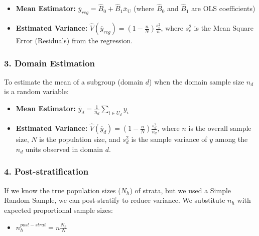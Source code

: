 \documentclass[
  letterpaper,
  DIV=11,
  numbers=noendperiod]{scrreprt}
\providecommand{\tightlist}{%
  \setlength{\itemsep}{0pt}\setlength{\parskip}{0pt}}
\renewcommand{\[}{\begin{equation}}
\renewcommand{\]}{\end{equation}}
\begin{document}
\begin{tcolorbox}
\begin{itemize}
\tightlist
\item
  \textbf{Mean Estimator:}
  \(\overline{y}_{reg} = \hat{B}_0 + \hat{B}_1 \overline{x}_{\text{U}}\)
  (where \(\hat{B}_0\) and \(\hat{B}_1\) are OLS coefficients)
\item
  \textbf{Estimated Variance:}
  \(\hat{V}(\overline{y}_{reg}) = \left(1 - \frac{n}{N}\right) \frac{s_e^2}{n}\),
  where \(s_e^2\) is the Mean Square Error (Residuals) from the
  regression.
\end{itemize}

\subsubsection*{3. Domain Estimation}\label{domain-estimation}

To estimate the mean of a subgroup (domain \(d\)) when the domain sample
size \(n_d\) is a random variable:

\begin{itemize}
\tightlist
\item
  \textbf{Mean Estimator:}
  \(\overline{y}_d = \frac{1}{n_d} \sum_{i \in U_d} y_i\)
\item
  \textbf{Estimated Variance:}
  \(\hat{V}(\overline{y}_d) = \left(1 - \frac{n}{N}\right) \frac{s_d^2}{n_d}\),
  where \(n\) is the overall sample size, \(N\) is the population size,
  and \(s_d^2\) is the sample variance of \(y\) among the \(n_d\) units
  observed in domain \(d\).
\end{itemize}

\subsubsection*{4. Post-stratification}\label{post-stratification}

If we know the true population sizes (\(N_h\)) of strata, but we used a
Simple Random Sample, we can post-stratify to reduce variance. We
substitute \(n_h\) with expected proportional sample sizes:

\begin{itemize}
\tightlist
\item
  \(n_h^{post-strat} = n \frac{N_h}{N}\)
\end{itemize}

\end{tcolorbox}
\end{document}
